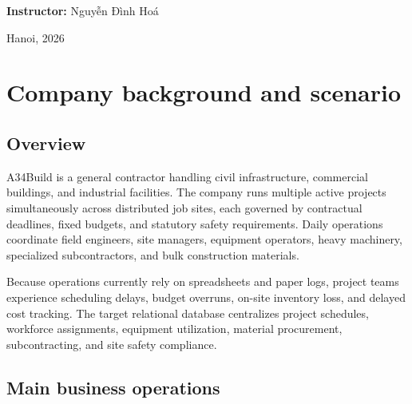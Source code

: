 \documentclass[a4paper,12pt]{report}
\begin{document}
\begin{titlepage}
\begin{center}
\vspace{0.8cm}

{\large\textbf{Instructor:} Nguyễn Đình Hoá}

\vfill

{\large Hanoi, 2026}

\end{center}
\end{titlepage}
\hypersetup{pageanchor=true}

\newpage
\tableofcontents

\newpage
\listoffigures
{}

\chapter{Company background and scenario}\label{company-background-and-scenario}

\section{Overview}\label{overview}

A34Build is a general contractor handling civil infrastructure, commercial buildings, and industrial facilities. The company runs multiple active projects simultaneously across distributed job sites, each governed by contractual deadlines, fixed budgets, and statutory safety requirements. Daily operations coordinate field engineers, site managers, equipment operators, heavy machinery, specialized subcontractors, and bulk construction materials.

Because operations currently rely on spreadsheets and paper logs, project teams experience scheduling delays, budget overruns, on-site inventory loss, and delayed cost tracking. The target relational database centralizes project schedules, workforce assignments, equipment utilization, material procurement, subcontracting, and site safety compliance.

\section{Main business operations}\label{main-business-operations}
\end{document}
